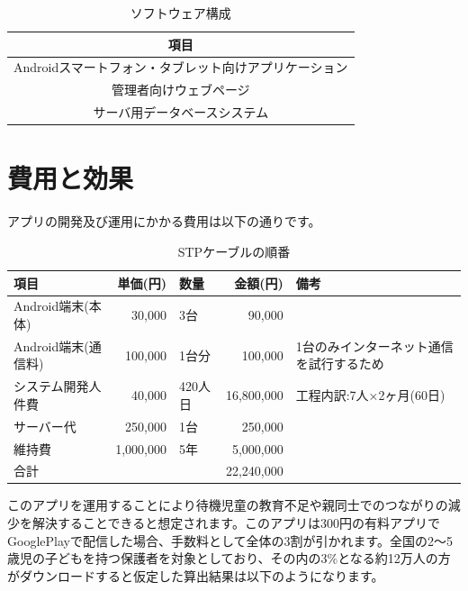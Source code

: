 \documentclass[a4j]{jarticle}
\begin{document}
\begin{table}[H]
    \caption{ソフトウェア構成}
    \label{tbl: table_software}
    \begin{center}
        \begin{tabular}{|c|} \hline
            項目 \\ \hline
            Androidスマートフォン・タブレット向けアプリケーション \\ \hline
            管理者向けウェブページ \\ \hline
            サーバ用データベースシステム \\ \hline
        \end{tabular}
    \end{center}
\end{table}

\section{費用と効果}
アプリの開発及び運用にかかる費用は以下の通りです。
　\begin{table}[htp]
\begin{center}
  \caption{STPケーブルの順番}
  \begin{tabular}{|l|r|l|r|l|}\hline
    項目& 単価(円) & 数量 & 金額(円) & 備考  \\ \hline
    Android端末(本体)& 30,000 & 3台 & 90,000 & 　 \\ \hline
    Android端末(通信料)& 100,000 & 1台分 & 100,000 & 1台のみインターネット通信を試行するため  \\ \hline
    システム開発人件費& 40,000 & 420人日 & 16,800,000 & 工程内訳:7人×2ヶ月(60日)  \\ \hline
    サーバー代& 250,000 & 1台 & 250,000 & 　 \\ \hline
    維持費& 1,000,000 & 5年 & 5,000,000 & 　　  \\ \hline
    \multicolumn{3}{|l|}{合計} & 22,240,000 &　 \\ \hline
  \end{tabular}
\end{center}
\end{table}

このアプリを運用することにより待機児童の教育不足や親同士でのつながりの減少を解決することできると想定されます。このアプリは300円の有料アプリでGooglePlayで配信した場合、手数料として全体の3割が引かれます。全国の2～5歳児の子どもを持つ保護者を対象としており、その内の3\%となる約12万人の方がダウンロードすると仮定した算出結果は以下のようになります。
\end{document}

